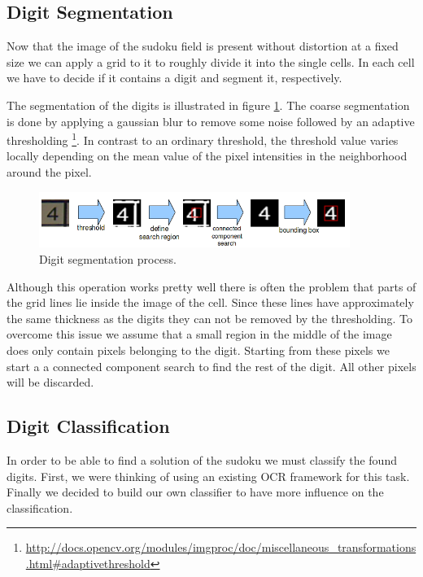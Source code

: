 \documentclass[
a4paper,     %
12pt         %
]{scrartcl}  %
\begin{document}
\subsection{Digit Segmentation}

Now that the image of the sudoku field is present without distortion at a
fixed size we can apply a grid to it to roughly divide it into the single
cells. In each cell we have to decide if it contains a digit and segment
it, respectively.

The segmentation of the digits is illustrated in figure \ref{fig:digit_seg}.
The coarse segmentation is done by applying a gaussian blur to remove some
noise followed by an adaptive thresholding
\footnote{\url{http://docs.opencv.org/modules/imgproc/doc/miscellaneous_transformations.html\#adaptivethreshold}}. 
In contrast to an ordinary threshold, the threshold value varies locally
depending on the mean value of the pixel intensities in the 
neighborhood around the pixel.

\begin{figure}
  \centering
  \includegraphics[width=0.9\textwidth]{imgs/segmentation.png}
  \caption{Digit segmentation process.}
  \label{fig:digit_seg}
\end{figure}

Although this operation works pretty well there is often the problem that
parts of the grid lines lie inside the image of the cell. Since these lines
have approximately the same thickness as the digits they can not be removed
by the thresholding. To overcome this issue we assume that a small region
in the middle of the image does only contain pixels belonging to the digit.
Starting from these pixels we start a a connected component search to find the
rest of the digit. All other pixels will be discarded.

\subsection{Digit Classification}

In order to be able to find a solution of the sudoku we must classify the
found digits. First, we were thinking of using an existing OCR framework
for this task. Finally we decided to build our own classifier to have more influence
on the classification.
\end{document}
